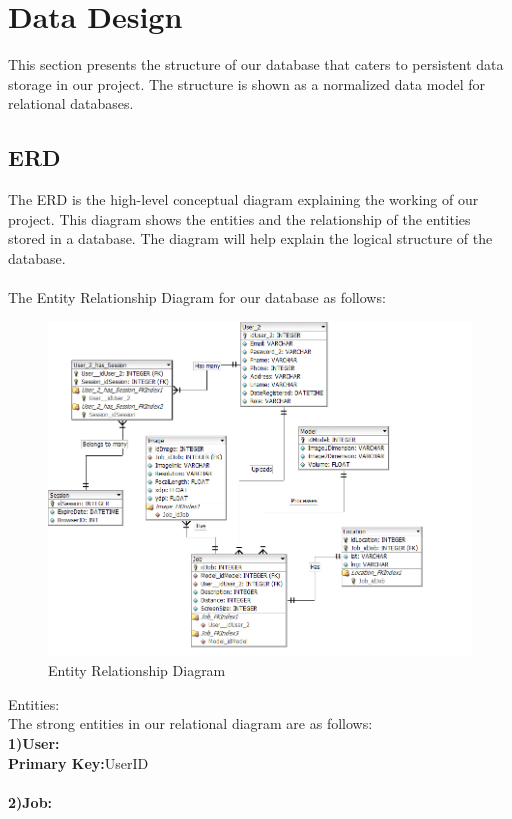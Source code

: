 \newpage
\section{Data Design}

This section presents the structure of our database that caters to persistent data storage in our project. The structure is shown as a normalized data model for relational databases.
\subsection{ERD}
The ERD is the high-level conceptual diagram explaining the working of our project. This diagram shows the entities and the relationship of the entities stored in a database. The diagram will help explain the logical structure of the database.\\
\\The Entity Relationship Diagram for our database as follows:
\begin{figure}[!hb]
   \centering
   \includegraphics[scale=0.4]{images/ERD.png}
    \caption{Entity Relationship Diagram}\label{fig:picture}
\end{figure}
\newpage
Entities:\\
The strong entities in our relational diagram are as follows:\\
\textbf{1)User:}\\
\textbf{Primary Key:}UserID\\
\\
\textbf{2)Job:}\\
